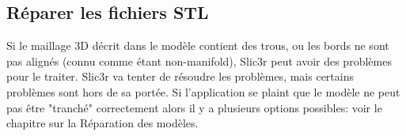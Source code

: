 
\subsection{R\'eparer les fichiers STL} %
\label{sub:cleaning_stls}
Si le maillage 3D d\'ecrit dans le mod\`ele contient des trous, ou les bords ne sont pas align\'es (connu comme \'etant non-manifold), Slic3r peut avoir des probl\`emes pour le traiter. Slic3r va tenter de r\'esoudre les probl\`emes, mais certains probl\`emes sont hors de sa port\'ee. Si l'application se plaint que le mod\`ele ne peut pas \^etre "tranch\'e" correctement alors il y a plusieurs options possibles: voir le chapitre sur la R\'eparation des mod\`eles.

